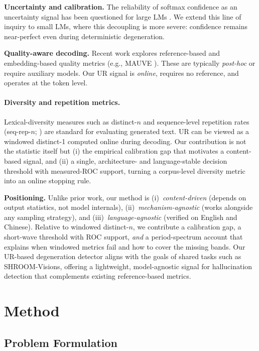 \documentclass[11pt]{article}
\begin{document}
\textbf{Uncertainty and calibration.} The reliability of softmax confidence as an uncertainty signal has been questioned for large LMs \citep{guo2017, jiang2021}. We extend this line of inquiry to small LMs, where this decoupling is more severe: confidence remains near-perfect even during deterministic degeneration.

\textbf{Quality-aware decoding.} Recent work explores reference-based and embedding-based quality metrics (e.g., MAUVE \citep{liu2021}). These are typically \emph{post-hoc} or require auxiliary models. Our UR signal is \emph{online}, requires no reference, and operates at the token level.

\paragraph{Diversity and repetition metrics.} Lexical-diversity measures such as distinct-$n$ \citep{li2016} and sequence-level repetition rates (seq-rep-$n$; \citealp{welleck2020}) are standard for evaluating generated text. UR can be viewed as a windowed distinct-1 computed online during decoding. Our contribution is not the statistic itself but (i) the empirical calibration gap that motivates a content-based signal, and (ii) a single, architecture- and language-stable decision threshold with measured-ROC support, turning a corpus-level diversity metric into an online stopping rule.

\textbf{Positioning.} Unlike prior work, our method is (i)~\emph{content-driven} (depends on output statistics, not model internals), (ii)~\emph{mechanism-agnostic} (works alongside any sampling strategy), and (iii)~\emph{language-agnostic} (verified on English and Chinese). Relative to windowed distinct-$n$, we contribute a calibration gap, a short-wave threshold with ROC support, \emph{and} a period-spectrum account that explains when windowed metrics fail and how to cover the missing bands. Our UR-based degeneration detector aligns with the goals of shared tasks such as SHROOM-Visions, offering a lightweight, model-agnostic signal for hallucination detection that complements existing reference-based metrics.

\section{Method}

\subsection{Problem Formulation}
\end{document}
